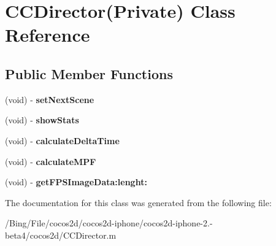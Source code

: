\hypertarget{interface_c_c_director_07_private_08}{\section{C\-C\-Director(Private) Class Reference}
\label{interface_c_c_director_07_private_08}
}
\subsection*{Public Member Functions}
\begin{DoxyCompactItemize}
\item 
\hypertarget{interface_c_c_director_07_private_08_ad1cde2281d02d5ab3b1c5d4f34f8fe79}{(void) -\/ {\bfseries set\-Next\-Scene}}\label{interface_c_c_director_07_private_08_ad1cde2281d02d5ab3b1c5d4f34f8fe79}

\item 
\hypertarget{interface_c_c_director_07_private_08_aa118e4c705c300099f5a1b6761a92035}{(void) -\/ {\bfseries show\-Stats}}\label{interface_c_c_director_07_private_08_aa118e4c705c300099f5a1b6761a92035}

\item 
\hypertarget{interface_c_c_director_07_private_08_a25daef8ea7a8ffa6e1522b947e8f2fba}{(void) -\/ {\bfseries calculate\-Delta\-Time}}\label{interface_c_c_director_07_private_08_a25daef8ea7a8ffa6e1522b947e8f2fba}

\item 
\hypertarget{interface_c_c_director_07_private_08_ac4e99446487144a98182e5ad063e4ee6}{(void) -\/ {\bfseries calculate\-M\-P\-F}}\label{interface_c_c_director_07_private_08_ac4e99446487144a98182e5ad063e4ee6}

\item 
\hypertarget{interface_c_c_director_07_private_08_a5b254a3cdc52b1e04154523572035963}{(void) -\/ {\bfseries get\-F\-P\-S\-Image\-Data\-:lenght\-:}}\label{interface_c_c_director_07_private_08_a5b254a3cdc52b1e04154523572035963}

\end{DoxyCompactItemize}


The documentation for this class was generated from the following file\-:\begin{DoxyCompactItemize}
\item 
/\-Bing/\-File/cocos2d/cocos2d-\/iphone/cocos2d-\/iphone-\/2.-\/beta4/cocos2d/C\-C\-Director.\-m\end{DoxyCompactItemize}
